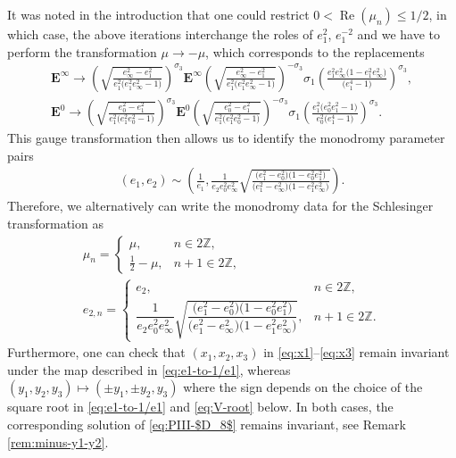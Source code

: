 \documentclass[11pt]{article}
\numberwithin{equation}{section}
\numberwithin{equation}{section}
\newcommand{\Z}{{\mathbb{Z}}}
\newcommand{\re}{\operatorname{Re}}
\begin{document}
\begin{Remark}
\label{remark:e2-mu-minus-mu-change}
It was noted in the introduction that one could restrict $0 < \re(\mu_n) \leq 1/2$, in which case, the above iterations interchange the roles of $e_1^2$, $e_1^{-2}$ and we have to perform the transformation $\mu\to -\mu$, which corresponds to the replacements
\begin{gather*}
\mathbf{E}^\infty\to \left(\sqrt{\frac{e_\infty^2-e_1^2}{e_1^2\big(e_1^2e_\infty^2-1\big)}}\right)^{\sigma_3}\mathbf{E}^\infty\left(\sqrt{\frac{e_\infty^2-e_1^2}{e_1^2\big(e_1^2e_\infty^2-1\big)}}\right)^{-\sigma_3}\sigma_1\left(\frac{e_1^2 e_\infty^2 \big(1-e_1^2 e_\infty^2\big)}{ \big(e_1^4-1\big)}\right)^{\sigma_3},\\
\mathbf{E}^0\to \left(\sqrt{\frac{e_0^2-e_1^2}{e_1^2\big(e_1^2e_0^2-1\big)}}\right)^{\sigma_3}\mathbf{E}^0\left(\sqrt{\frac{e_0^2-e_1^2}{e_1^2\big(e_1^2e_0^2-1\big)}}\right)^{-\sigma_3}\sigma_1\left(\frac{e_1^2 \big(e_0^2 e_1^2-1\big)}{ e_0^2 \big(e_1^4-1\big)}\right)^{\sigma_3}.
\end{gather*}
This gauge transformation then allows us to identify the monodromy parameter pairs
\begin{gather}
(e_1,e_2)\sim \left(\frac{1}{e_1},\frac{1}{e_2e_0^2e_\infty^2}\sqrt{\frac{\big(e_1^2-e_0^2\big)\big(1-e_0^2e_1^2\big)}{\big(e_1^2-e_\infty^2\big)\big(1-e_1^2e_\infty^2\big)}}\right).
\label{eq:e1-to-1/e1}
\end{gather}
Therefore, we alternatively can write the monodromy data for the Schlesinger transformation as
\begin{gather*}
\mu_n = \begin{cases} \mu, & n \in 2\Z, \\ \frac{1}{2}-\mu, & n +1 \in 2\Z, \end{cases} \\
 e_{2,n}=\begin{cases} e_2, & n \in 2\Z, \\ \dfrac{1}{e_2e_0^2e_\infty^2}\sqrt{\dfrac{\big(e_1^2-e_0^2\big)\big(1-e_0^2e_1^2\big)}{\big(e_1^2-e_\infty^2\big)\big(1-e_1^2e_\infty^2\big)}}, & n +1 \in 2\Z. \end{cases}
\end{gather*}
Furthermore, one can check that $(x_1, x_2, x_3)$ in \eqref{eq:x1}--\eqref{eq:x3} remain invariant under the map described in \eqref{eq:e1-to-1/e1}, whereas $(y_1, y_2, y_3) \mapsto (\pm y_1, \pm y_2, y_3)$ where the sign depends on the choice of the square root in \eqref{eq:e1-to-1/e1} and \eqref{eq:V-root} below. In both cases, the corresponding solution of \eqref{eq:PIII-$D_8$} remains invariant, see Remark \ref{rem:minus-y1-y2}.
\end{Remark}
\end{document}
